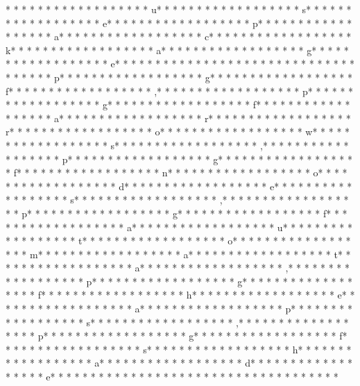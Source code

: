 * * *  * * *  * * *  *  * * *  *  * * *  * u* * *  * * *  * * *  *  * * *  *  * * *  * s* * *  * * *  * * *  *  * * *  *  * * *  * e* * *  * * *  * * *  *  * * *  *  * * *  * p* * *  * * *  * * *  *  * * *  *  * * *  * a* * *  * * *  * * *  *  * * *  *  * * *  * c* * *  * * *  * * *  *  * * *  *  * * *  * k* * *  * * *  * * *  *  * * *  *  * * *  * a* * *  * * *  * * *  *  * * *  *  * * *  * g* * *  * * *  * * *  *  * * *  *  * * *  * e* * *  * * *  * * *  *  * * *  *  * * *  * {* * *  * * *  * * *  *  * * *  *  * * *  * p* * *  * * *  * * *  *  * * *  *  * * *  * g* * *  * * *  * * *  *  * * *  *  * * *  * f* * *  * * *  * * *  *  * * *  *  * * *  * ,* * *  * * *  * * *  *  * * *  *  * * *  * p* * *  * * *  * * *  *  * * *  *  * * *  * g* * *  * * *  * * *  *  * * *  *  * * *  * f* * *  * * *  * * *  *  * * *  *  * * *  * a* * *  * * *  * * *  *  * * *  *  * * *  * r* * *  * * *  * * *  *  * * *  *  * * *  * r* * *  * * *  * * *  *  * * *  *  * * *  * o* * *  * * *  * * *  *  * * *  *  * * *  * w* * *  * * *  * * *  *  * * *  *  * * *  * s* * *  * * *  * * *  *  * * *  *  * * *  * ,* * *  * * *  * * *  *  * * *  *  * * *  * p* * *  * * *  * * *  *  * * *  *  * * *  * g* * *  * * *  * * *  *  * * *  *  * * *  * f* * *  * * *  * * *  *  * * *  *  * * *  * n* * *  * * *  * * *  *  * * *  *  * * *  * o* * *  * * *  * * *  *  * * *  *  * * *  * d* * *  * * *  * * *  *  * * *  *  * * *  * e* * *  * * *  * * *  *  * * *  *  * * *  * s* * *  * * *  * * *  *  * * *  *  * * *  * ,* * *  * * *  * * *  *  * * *  *  * * *  * p* * *  * * *  * * *  *  * * *  *  * * *  * g* * *  * * *  * * *  *  * * *  *  * * *  * f* * *  * * *  * * *  *  * * *  *  * * *  * a* * *  * * *  * * *  *  * * *  *  * * *  * u* * *  * * *  * * *  *  * * *  *  * * *  * t* * *  * * *  * * *  *  * * *  *  * * *  * o* * *  * * *  * * *  *  * * *  *  * * *  * m* * *  * * *  * * *  *  * * *  *  * * *  * a* * *  * * *  * * *  *  * * *  *  * * *  * t* * *  * * *  * * *  *  * * *  *  * * *  * a* * *  * * *  * * *  *  * * *  *  * * *  * ,* * *  * * *  * * *  *  * * *  *  * * *  * p* * *  * * *  * * *  *  * * *  *  * * *  * g* * *  * * *  * * *  *  * * *  *  * * *  * f* * *  * * *  * * *  *  * * *  *  * * *  * h* * *  * * *  * * *  *  * * *  *  * * *  * e* * *  * * *  * * *  *  * * *  *  * * *  * a* * *  * * *  * * *  *  * * *  *  * * *  * p* * *  * * *  * * *  *  * * *  *  * * *  * s* * *  * * *  * * *  *  * * *  *  * * *  * ,* * *  * * *  * * *  *  * * *  *  * * *  * p* * *  * * *  * * *  *  * * *  *  * * *  * g* * *  * * *  * * *  *  * * *  *  * * *  * f* * *  * * *  * * *  *  * * *  *  * * *  * s* * *  * * *  * * *  *  * * *  *  * * *  * h* * *  * * *  * * *  *  * * *  *  * * *  * a* * *  * * *  * * *  *  * * *  *  * * *  * d* * *  * * *  * * *  *  * * *  *  * * *  * e* * *  * * *  * * *  *  * * *  *  * * *  * }* * *  * * *  * * *  *  * * *  *  * * *  * 

